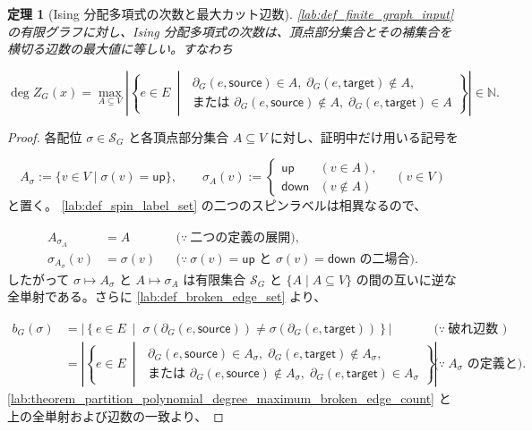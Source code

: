 \documentclass[11pt,a4paper]{article}
\newtheorem{theorem}[definition]{定理}
\theoremstyle{remark}
\begin{document}
\begin{theorem}[Ising 分配多項式の次数と最大カット辺数]\label{lab:theorem_partition_polynomial_degree_maximum_cut_size}
\cref{lab:def_finite_graph_input}
 の有限グラフに対し、Ising 分配多項式の次数は、頂点部分集合とその補集合を横切る辺数の最大値に等しい。すなわち

\[\deg Z_G(x)
=
\max_{A\subseteq V}
\left|
  \left\{
    e\in E
    \ \middle|\;
    \begin{array}{l}
      \partial_G(e,\mathsf{source})\in A,\;
      \partial_G(e,\mathsf{target})\notin A,\\
      \text{または }\partial_G(e,\mathsf{source})\notin A,\;
      \partial_G(e,\mathsf{target})\in A
    \end{array}
  \right\}
\right|
\in\mathbb N.\]
\end{theorem}
\begin{proof}
各配位 
$\sigma\in\mathcal S_G$
 と各頂点部分集合 
$A\subseteq V$
 に対し、証明中だけ用いる記号を

\[A_\sigma:=\{v\in V\mid \sigma(v)=\mathsf{up}\},\qquad
\sigma_A(v):=
\begin{cases}
  \mathsf{up} & (v\in A),\\
  \mathsf{down} & (v\notin A)
\end{cases}
\quad(v\in V)\]
と置く。
\cref{lab:def_spin_label_set}
 の二つのスピンラベルは相異なるので、

\[\begin{aligned}
A_{\sigma_A}
&=A
&&\bigl(\because\ \text{二つの定義の展開}\bigr),\\
\sigma_{A_\sigma}(v)
&=\sigma(v)
&&\bigl(\because\ \sigma(v)=\mathsf{up}\text{ と }\sigma(v)=\mathsf{down}\text{ の二場合}\bigr).
\end{aligned}\]
したがって 
$\sigma\mapsto A_\sigma$
 と 
$A\mapsto\sigma_A$
 は有限集合 
$\mathcal S_G$
 と 
$\{A\mid A\subseteq V\}$
 の間の互いに逆な全単射である。さらに 
\cref{lab:def_broken_edge_set}
 より、

\[\begin{aligned}
b_G(\sigma)
&=
\left|
  \left\{
    e\in E
    \ \middle|\;
    \sigma\!\left(\partial_G(e,\mathsf{source})\right)
    \ne
    \sigma\!\left(\partial_G(e,\mathsf{target})\right)
  \right\}
\right|
&&\bigl(\because\ \text{破れ辺数の定義}\bigr)\\
&=
\left|
  \left\{
    e\in E
    \ \middle|\;
    \begin{array}{l}
      \partial_G(e,\mathsf{source})\in A_\sigma,\;
      \partial_G(e,\mathsf{target})\notin A_\sigma,\\
      \text{または }\partial_G(e,\mathsf{source})\notin A_\sigma,\;
      \partial_G(e,\mathsf{target})\in A_\sigma
    \end{array}
  \right\}
\right|
&&\bigl(\because\ A_\sigma\text{ の定義と二つのスピンラベルの相異性}\bigr).
\end{aligned}\]
\cref{lab:theorem_partition_polynomial_degree_maximum_broken_edge_count}
 と上の全単射および辺数の一致より、


\end{proof}
\end{document}
